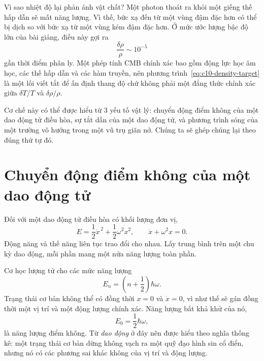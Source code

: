 Vì sao nhiệt độ lại phản ánh vật chất? Một photon thoát ra khỏi một giếng thế hấp dẫn sẽ mất năng lượng. Vì thế, bức xạ đến từ một vùng đậm đặc hơn có thể bị dịch so với bức xạ từ một vùng kém đậm đặc hơn. Ở mức ước lượng bậc độ lớn của bài giảng, điều này gợi ra
\begin{equation}
\frac{\delta\rho}{\rho}\sim10^{-5}
\label{eq:c10-density-target}
\end{equation}
gần thời điểm phân ly. Một phép tính CMB chính xác bao gồm động lực học âm học, các thế hấp dẫn và các hàm truyền, nên phương trình~\eqref{eq:c10-density-target} là một lối viết tắt để ấn định thang độ chứ không phải một đẳng thức chính xác giữa \(\delta T/T\) và \(\delta\rho/\rho\).

\begin{classroomqa}
\end{classroomqa}

Cơ chế này có thể được hiểu từ 3 yếu tố vật lý: chuyển động điểm không của một dao động tử điều hòa, sự tắt dần của một dao động tử, và phương trình sóng của một trường vô hướng trong một vũ trụ giãn nở. Chúng ta sẽ ghép chúng lại theo đúng thứ tự đó.

\section{Chuyển động điểm không của một dao động tử}

Đối với một dao động tử điều hòa có khối lượng đơn vị,
\begin{equation}
E=\frac12\dot x^{\,2}+\frac12\omega^2x^2,
\qquad
\ddot x+\omega^2x=0.
\label{eq:c10-undamped}
\end{equation}
Động năng và thế năng liên tục trao đổi cho nhau. Lấy trung bình trên một chu kỳ dao động, mỗi phần mang một nửa năng lượng toàn phần.

Cơ học lượng tử cho các mức năng lượng
\begin{equation}
E_n=\left(n+\frac12\right)\hbar\omega.
\label{eq:c10-oscillator-levels}
\end{equation}
Trạng thái cơ bản không thể có đồng thời \(x=0\) và \(\dot x=0\), vì như thế sẽ gán đồng thời một vị trí và một động lượng chính xác. Năng lượng bất khả khử của nó,
\[
E_0=\frac12\hbar\omega,
\]
là năng lượng điểm không. Từ \emph{dao động} ở đây nên được hiểu theo nghĩa thống kê: một trạng thái cơ bản dừng không vạch ra một quỹ đạo hình sin cổ điển, nhưng nó có các phương sai khác không của vị trí và động lượng.


